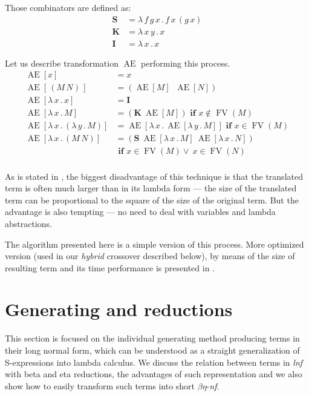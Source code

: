 \documentclass{sig-alternate}
\newcommand{\Lets}{Let us\xspace}
\newcommand{\lamb}[2]{( \lambda \, #1 \, . \, #2 )}
\newcommand{\lam}[2]{\lambda \, #1 \, . \, #2}
\newcommand{\FV}{\mathop{\mathrm{FV}}}
\newcommand{\Scomb }{\mathbf{S}}
\newcommand{\Kcomb }{\mathbf{K}}
\newcommand{\Icomb }{\mathbf{I}}
\newcommand{\benf}{$\beta\eta$-\textit{nf}\xspace}
\newcommand{\lnf}{\textit{lnf}\xspace}
\newcommand{\Ae}{\mathop{\mathrm{AE}}}
\begin{document}
Those combinators are defined as:
\begin{align*}
\Scomb &= \lam{f\,g\,x}{f\,x\,(g\,x)} \\
\Kcomb &= \lam{x\,y}{x} \\
\Icomb &= \lam{x}{x} 
\end{align*}


\Lets describe transformation $\Ae$ performing this 
process.
\begin{align*}
\Ae[x]           &= x\\[0.4em]
\Ae[\,(M\,N)\,]  &= (\Ae[M]\;\;\Ae[N])\\[0.4em]
\Ae[\lam{x}{x}]  &= \Icomb\\
\Ae[\lam{x}{M}]  &= (\Kcomb~\Ae[M]) \textbf{ if } x \not\in \FV(M)\\
\Ae[\lam{x}{\lamb{y}{M}}] &= \Ae[\lam{x}{\Ae[\lam{y}{M}]}]  \textbf{ if } x \in \FV(M)\\
\Ae[\lam{x}{(M\,N)}] &= (\Scomb~\Ae[\lam{x}{M}]~\Ae[\lam{x}{N}])\\
&\textbf{ if } x \in \FV(M) \vee~ x \in \FV(N)\\
\end{align*}

As is stated in \cite{jones87},
the biggest disadvantage of this technique is that the translated
term is often much larger than in its lambda form --- the size of
the translated term can be proportional to the square of the size 
of the original term. But the advantage is also tempting --- no need to deal with variables and lambda abstractions.

The algorithm presented here is a simple version of this process. 
More optimized version (used in our \textit{hybrid} cross\-over described below), by means of the size of resulting term and its time performance is presented in \cite{jones87}. 

\section{Generating and reductions}
\label{generating}

This section is focused on the individual generating meth\-od producing
terms in their long normal form, which can be understood as a straight 
generalization of S-expressions into lambda calculus. 
We discuss the relation between terms in \lnf with beta and eta reductions,
the advantages of such representation and we also show how to easily 
transform such terms into short \benf.
   
\end{document}
